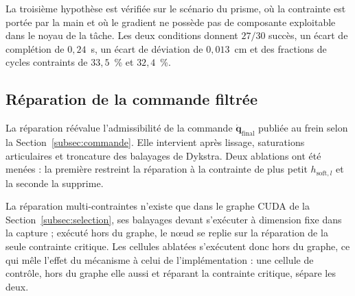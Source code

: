 La troisième hypothèse est vérifiée sur le scénario du prisme, où la contrainte est portée par la main et où le gradient ne possède pas de composante exploitable dans le noyau de la tâche. Les deux conditions donnent $27/30$ succès, un écart de complétion de $0{,}24$~s, un écart de déviation de $0{,}013$~cm et des fractions de cycles contraints de $33{,}5$~\% et $32{,}4$~\%.

\subsection{Réparation de la commande filtrée}\label{subsec:res_abl_reparation}
La réparation réévalue l'admissibilité de la commande $\dot{\mathbf{q}}_{\mathrm{final}}$ publiée au frein selon la Section~\ref{subsec:commande}. Elle intervient après lissage, saturations articulaires et troncature des balayages de Dykstra. Deux ablations ont été menées : la première restreint la réparation à la contrainte de plus petit $h_{\mathrm{soft},l}$ et la seconde la supprime.

La réparation multi-contraintes n'existe que dans le graphe \ac{CUDA} de la Section~\ref{subsec:selection}, ses balayages devant s'exécuter à dimension fixe dans la capture ; exécuté hors du graphe, le n\oe ud se replie sur la réparation de la seule contrainte critique. Les cellules ablatées s'exécutent donc hors du graphe, ce qui mêle l'effet du mécanisme à celui de l'implémentation : une cellule de contrôle, hors du graphe elle aussi et réparant la contrainte critique, sépare les deux.


